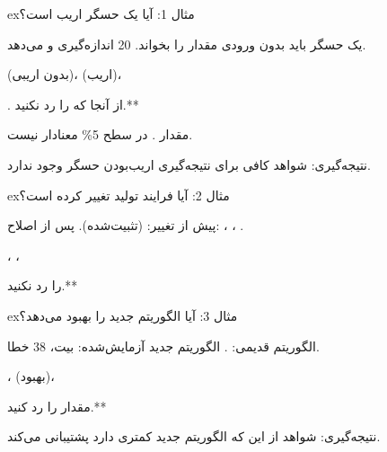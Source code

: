 
\begin{PSbox}[unbreakable]{ex}{مثال 1: آیا یک حسگر اریب است؟}

یک حسگر باید بدون ورودی مقدار  را بخواند. 20 اندازه‌گیری  و  می‌دهد.

 (بدون اریبی)،  (اریب)، 


. از آنجا که  را رد نکنید.**

مقدار . در سطح 5\% معنادار نیست.

نتیجه‌گیری: شواهد کافی برای نتیجه‌گیری اریب‌بودن حسگر وجود ندارد.

\end{PSbox}

\begin{PSbox}[unbreakable]{ex}{مثال 2: آیا فرایند تولید تغییر کرده است؟}

پیش از تغییر:  (تثبیت‌شده). پس از اصلاح: ، ، .

، ، 


 را رد نکنید.**

\end{PSbox}

\begin{PSbox}[unbreakable]{ex}{مثال 3: آیا الگوریتم جدید  را بهبود می‌دهد؟}

الگوریتم قدیمی: . الگوریتم جدید آزمایش‌شده:  بیت، 38 خطا.


،  (بهبود)، 


مقدار  را رد کنید.**

نتیجه‌گیری: شواهد از این که الگوریتم جدید  کمتری دارد پشتیبانی می‌کند.

\end{PSbox}

